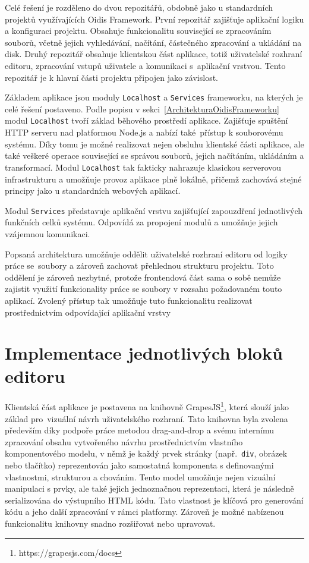 Celé řešení je rozděleno do dvou repozitářů, obdobně jako u standardních projektů využívajících Oidis Framework. První repozitář zajišťuje aplikační logiku a konfiguraci projektu. Obsahuje funkcionalitu související se zpracováním souborů, včetně jejich vyhledávání, načítání, částečného zpracování a ukládání na disk. Druhý repozitář obsahuje klientskou část aplikace, totiž uživatelské rozhraní editoru, zpracování vstupů uživatele a komunikaci s~aplikační vrstvou. Tento repozitář je k hlavní části projektu připojen jako závislost.

Základem aplikace jsou moduly \texttt{Localhost} a \texttt{Services} frameworku, na kterých je celé řešení postaveno. Podle popisu v sekci~\ref{ArchitekturaOidisFrameworku} modul \texttt{Localhost} tvoří základ běhového prostředí aplikace. Zajišťuje spuštění HTTP serveru nad platformou Node.js a nabízí také~přístup k souborovému systému. Díky tomu je možné realizovat nejen obsluhu klientské části aplikace, ale také veškeré operace související se správou souborů, jejich načítáním, ukládáním a transformací. Modul \texttt{Localhost} tak fakticky nahrazuje klasickou serverovou infrastrukturu a umožňuje provoz aplikace plně lokálně, přičemž zachovává stejné principy jako u standardních webových aplikací.

Modul \texttt{Services} představuje aplikační vrstvu zajišťující zapouzdření jednotlivých funkčních celků systému. Odpovídá za propojení modulů a umožňuje jejich vzájemnou komunikaci.

Popsaná architektura umožňuje oddělit uživatelské rozhraní editoru od logiky práce se~soubory a zároveň zachovat přehlednou strukturu projektu. Toto oddělení je zároveň nezbytné, protože frontendová část sama o sobě nemůže zajistit využití funkcionality práce se soubory v rozsahu požadovaném touto aplikací. Zvolený přístup tak umožňuje tuto funkcionalitu realizovat prostřednictvím odpovídající aplikační vrstvy

\section{Implementace jednotlivých bloků editoru}
\label{GrapeJs}

Klientská část aplikace je postavena na knihovně GrapesJS\footnote{https://grapesjs.com/docs}, která slouží jako základ pro~vizuální návrh uživatelského rozhraní. Tato knihovna byla zvolena především díky podpoře práce metodou drag-and-drop a svému internímu zpracování obsahu vytvořeného návrhu prostřednictvím vlastního komponentového modelu, v němž je každý prvek stránky (např.~\texttt{div}, obrázek nebo tlačítko) reprezentován jako samostatná komponenta s definovanými vlastnostmi, strukturou a chováním. Tento model umožňuje nejen vizuální manipulaci s prvky, ale také jejich jednoznačnou reprezentaci, která je následně serializována do výstupního HTML kódu. Tato vlastnost je klíčová pro generování kódu a jeho další zpracování v rámci platformy. Zároveň je možné nabízenou funkcionalitu knihovny snadno rozšiřovat nebo upravovat.

